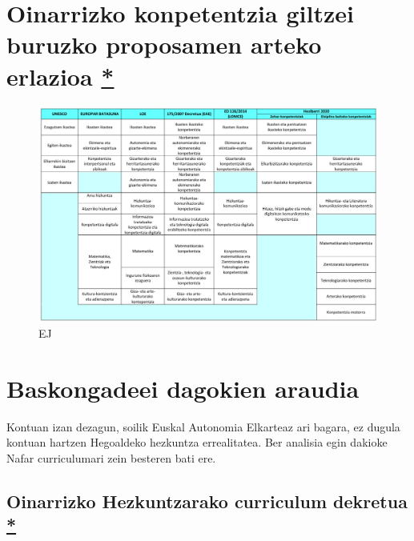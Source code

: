 \documentclass[]{book}
\begin{document}
\hypertarget{oinarrizko-konpetentzia-giltzei-buruzko-proposamen-arteko-erlazioa}{%
\section{\texorpdfstring{Oinarrizko konpetentzia giltzei buruzko proposamen arteko erlazioa \href{http://www.hezkuntza.ejgv.euskadi.eus/contenidos/informacion/heziberri_2020/eu_erlazioa/adjuntos/oinarrizko_konpetentzia_giltzei_buruzko_proposamen_arteko_erlazioa.pdf}{*}}{Oinarrizko konpetentzia giltzei buruzko proposamen arteko erlazioa *}}\label{oinarrizko-konpetentzia-giltzei-buruzko-proposamen-arteko-erlazioa}}

\begin{figure}
\centering
\includegraphics{assets/02_01-HD.png}
\caption{EJ}
\end{figure}

\hypertarget{baskongadeei-dagokien-araudia}{%
\section{Baskongadeei dagokien araudia}\label{baskongadeei-dagokien-araudia}}

Kontuan izan dezagun, soilik Euskal Autonomia Elkarteaz ari bagara, ez dugula kontuan hartzen Hegoaldeko hezkuntza errealitatea. Ber analisia egin dakioke Nafar curriculumari zein besteren bati ere.

\hypertarget{oinarrizko-hezkuntzarako-curriculum-dekretua}{%
\subsection{\texorpdfstring{Oinarrizko Hezkuntzarako curriculum dekretua \href{https://www.euskadi.eus/y22-bopv/eu/bopv2/datos/2016/01/1600141e.shtml}{*}}{Oinarrizko Hezkuntzarako curriculum dekretua *}}\label{oinarrizko-hezkuntzarako-curriculum-dekretua}}
\end{document}
